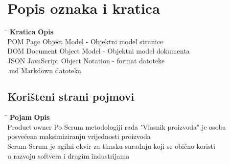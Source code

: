 \chapter*{Popis oznaka i kratica}\label{TOA}

\begin{tabbing}
\hspace{80pt}\=\kill
\textbf{Kratica} \> \textbf{Opis} \\ 
 POM \> Page Object Model - Objektni model stranice  \\ 
 DOM \> Document Object Model - Objektni model dokumenta  \\ 
 JSON \> JavaScript Object Notation - format datoteke \\ 
 .md \> Markdown datoteka\\
 \end{tabbing} 


\section*{Korišteni strani pojmovi}
\begin{tabbing}
\hspace{100pt}\=\kill
\textbf{Pojam} \> \textbf{Opis} \\ 
Product owner \> Po Scrum metodologiji rada "Vlasnik proizvoda" je osoba\\ 
\> posvećena maksimiziranju vrijednosti proizvoda \\
Scrum \> Scrum je agilni okvir za timsku suradnju koji se obično koristi\\
\>u razvoju softvera i drugim industrijama
\end{tabbing} 